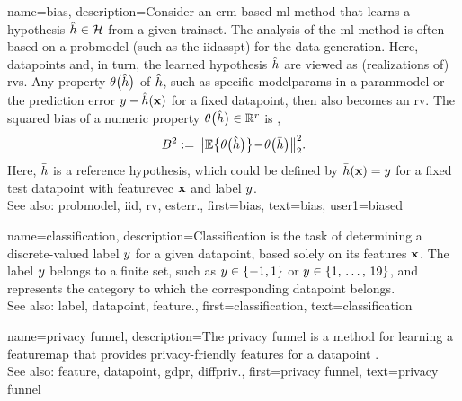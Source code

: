 {name={bias},
	description={Consider an \gls{erm}-based \gls{ml} method that  
		learns a \gls{hypothesis} $\hat{h} \in \mathcal{H}$ 
		from a given \gls{trainset}. The analysis of the \gls{ml} method 
		is often based on a \gls{probmodel} (such as the \gls{iidasspt}) 
		for the \gls{data} generation. Here, \glspl{datapoint} and, in turn, 
		the learned \gls{hypothesis} $\hat{h}$ are viewed as 
		(\glspl{realization} of) \glspl{rv}. Any property 
		$\theta\big(\hat{h}\big)$ of $\hat{h}$, 
		such as specific \glspl{modelparam} in a \gls{parammodel} 
		or the \gls{prediction} error $y - \hat{h}({\bf x})$ 
		for a fixed \gls{datapoint}, then also becomes an \gls{rv}. 
		The squared bias of a numeric property $\theta\big(\hat{h}\big) \in \mathbb{R}^{r}$ 
		is \cite{BishopBook}, \cite{hastie01statisticallearning}
		$$B^{2} := \big\| \mathbb{E} \big\{ \theta\big(\hat{h}\big) \big\}\!-\!\theta\big(\bar{h}\big)  \big\|_{2}^{2}.$$
		Here, $\bar{h}$ is a reference \gls{hypothesis}, which 
		could be defined by $\bar{h}({\bf x})=y$ 
		for a fixed test \gls{datapoint} with \gls{featurevec} ${\bf x}$ 
		and \gls{label} $y$. 
					\\ 
		See also: \gls{probmodel}, \gls{iid}, \gls{rv}, \gls{esterr}.},
	first={bias},
	text={bias},
	user1={biased}
}

{name={classification},
	description={Classification is the task of determining a 
 		discrete-valued \gls{label} $y$ for a given \gls{datapoint}, based solely on its 
 		\glspl{feature} ${\bf x}$. The \gls{label} $y$ belongs to a finite set, such as 
 		$y \in \{-1,1\}$ or $y \in \{1, \,\ldots, \,19\}$, and represents the 
 		category to which the corresponding \gls{datapoint} belongs.
				\\ 
		See also: \gls{label}, \gls{datapoint}, \gls{feature}.}, %
	first={classification},
	text={classification} 
}

{name={privacy funnel},
	description={The privacy funnel is a method for learning 
		a \gls{featuremap} that provides privacy-friendly \glspl{feature} for a 
		\gls{datapoint} \cite{PrivacyFunnel}.
				\\ 
		See also: \gls{feature}, \gls{datapoint}, \gls{gdpr}, \gls{diffpriv}.},
 	first={privacy funnel},
	text={privacy funnel} 
}


